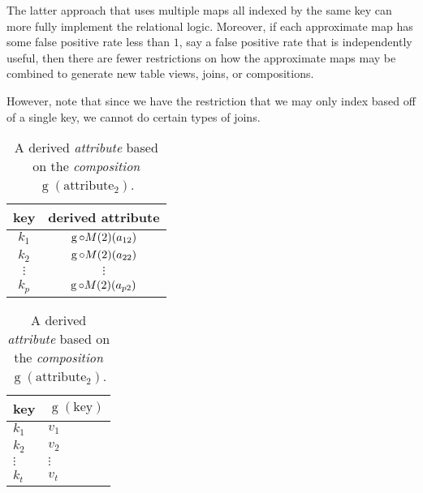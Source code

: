 \documentclass[ ../main.tex]{subfiles}
\begin{document}
The latter approach that uses multiple maps all indexed by the same key can more fully implement the relational logic. Moreover, if each approximate map has some false positive rate less than $1$, say a false positive rate that is independently useful, then there are fewer restrictions on how the approximate maps may be combined to generate new table views, joins, or compositions.

However, note that since we have the restriction that we may only index based off of a single key, we cannot do certain types of joins.


\begin{table}[h]
\centering
\caption{A derived \emph{attribute} based on the \emph{composition} $\operatorname{g}(\text{attribute$_2$})$.}
\label{tbl:relation_derived}
\begin{tabular}{|c c|} 
\hline
key & derived attribute\\
\hline
    $k_1$ & $\operatorname{g} \circ M(2)(a_{1 2})$\\
    $k_2$ & $\operatorname{g} \circ M(2)(a_{2 2})$\\
    $\vdots$ & $\vdots$\\
    $k_p$ & $\operatorname{g} \circ M(2)(a_{p 2})$\\
\hline
\end{tabular}
\begin{tabular}{l l} 
\toprule
key & $\operatorname{g}(\text{key})$\\
\midrule
    $k_1$ & $v_1$\\
    $k_2$ & $v_2$\\
    $\vdots$ & $\vdots$\\
    $k_t$ & $v_t$\\
\bottomrule
\end{tabular}
\end{table}
\end{document}
